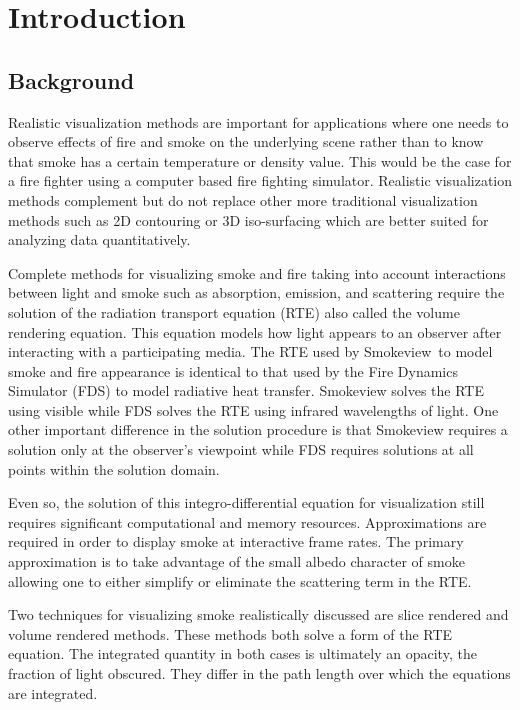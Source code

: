 %
%

\section{Introduction}

\subsection{Background}

Realistic visualization methods are important for applications
where one needs to observe effects of fire and smoke on the underlying scene
rather than to know that smoke has a certain temperature or density value.  This would be the case for a fire fighter using a computer based fire fighting simulator.
Realistic visualization  methods complement but do not replace other more traditional visualization methods such as 2D
contouring or 3D iso-surfacing which are better suited for analyzing data quantitatively.

Complete methods for visualizing smoke and fire taking into
account interactions between light and smoke such as absorption, emission, and scattering
require the solution of the radiation transport equation (RTE)\cite{Siegel:2001} also called the volume rendering equation\cite{levoy:1988}.
This equation models how light appears to an observer after interacting with a participating media.
The RTE used by Smokeview\citesmv\ to model smoke and fire appearance is identical to that used by the Fire Dynamics Simulator (FDS)\cite{FDS_Tech_Guide}
to model radiative heat transfer.  Smokeview solves the RTE using visible while FDS solves the RTE using infrared wavelengths of light. One other important difference in the solution procedure is that Smokeview requires a solution only at the observer's viewpoint while FDS requires solutions at all points within the solution domain.

Even so, the
solution of this integro-differential equation for visualization still requires significant
computational and memory  resources.  Approximations
are required in order to display smoke at
interactive frame rates.  The primary approximation is to take
advantage of the small albedo character of smoke allowing one to either simplify or eliminate the scattering term in the RTE.

Two techniques for visualizing smoke realistically discussed are slice rendered and volume
rendered methods.  These methods both solve a form of the RTE equation.
The integrated quantity in both cases is ultimately an opacity, the fraction of light obscured.
They
differ in the path length over which the equations are integrated.

